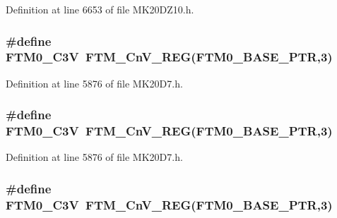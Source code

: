 Definition at line 6653 of file M\+K20\+D\+Z10.\+h.

\subsubsection[{\texorpdfstring{F\+T\+M0\+\_\+\+C3V}{FTM0_C3V}}]{\setlength{\rightskip}{0pt plus 5cm}\#define F\+T\+M0\+\_\+\+C3V~{\bf F\+T\+M\+\_\+\+Cn\+V\+\_\+\+R\+EG}({\bf F\+T\+M0\+\_\+\+B\+A\+S\+E\+\_\+\+P\+TR},3)}\hypertarget{group___f_t_m___register___accessor___macros_gacbab9456bb54ac9e375e896bd055ef7f}{}\label{group___f_t_m___register___accessor___macros_gacbab9456bb54ac9e375e896bd055ef7f}


Definition at line 5876 of file M\+K20\+D7.\+h.

\subsubsection[{\texorpdfstring{F\+T\+M0\+\_\+\+C3V}{FTM0_C3V}}]{\setlength{\rightskip}{0pt plus 5cm}\#define F\+T\+M0\+\_\+\+C3V~{\bf F\+T\+M\+\_\+\+Cn\+V\+\_\+\+R\+EG}({\bf F\+T\+M0\+\_\+\+B\+A\+S\+E\+\_\+\+P\+TR},3)}\hypertarget{group___f_t_m___register___accessor___macros_gacbab9456bb54ac9e375e896bd055ef7f}{}\label{group___f_t_m___register___accessor___macros_gacbab9456bb54ac9e375e896bd055ef7f}


Definition at line 5876 of file M\+K20\+D7.\+h.

\subsubsection[{\texorpdfstring{F\+T\+M0\+\_\+\+C3V}{FTM0_C3V}}]{\setlength{\rightskip}{0pt plus 5cm}\#define F\+T\+M0\+\_\+\+C3V~{\bf F\+T\+M\+\_\+\+Cn\+V\+\_\+\+R\+EG}({\bf F\+T\+M0\+\_\+\+B\+A\+S\+E\+\_\+\+P\+TR},3)}\hypertarget{group___f_t_m___register___accessor___macros_gacbab9456bb54ac9e375e896bd055ef7f}{}\label{group___f_t_m___register___accessor___macros_gacbab9456bb54ac9e375e896bd055ef7f}


